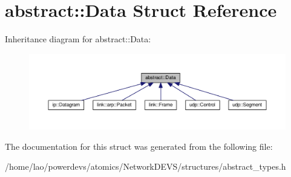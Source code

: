\hypertarget{structabstract_1_1Data}{}\section{abstract\+:\+:Data Struct Reference}
\label{structabstract_1_1Data}


Inheritance diagram for abstract\+:\+:Data\+:\nopagebreak
\begin{figure}[H]
\begin{center}
\leavevmode
\includegraphics[width=350pt]{structabstract_1_1Data__inherit__graph}
\end{center}
\end{figure}


The documentation for this struct was generated from the following file\+:\begin{DoxyCompactItemize}
\item 
/home/lao/powerdevs/atomics/\+Network\+D\+E\+V\+S/structures/abstract\+\_\+types.\+h\end{DoxyCompactItemize}
